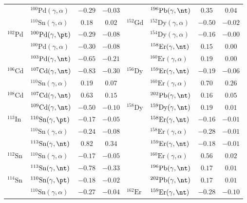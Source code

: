 {\begin{longtable}{llcc llcc}
$ $ & $^{100}\mathrm{Pd}(\gamma,\alpha)$ & $-0.29$ & $-0.03$ & $ $ & $^{196}\mathrm{Pb}(\gamma,\nt)$ & $0.35$ & $0.04$ \\ 
$ $ & $^{110}\mathrm{Sn}(\gamma,\alpha)$ & $0.18$ & $0.02$ & $^{152}\mathrm{Gd}$ & $^{152}\mathrm{Dy}(\gamma,\alpha)$ & $-0.50$ & $-0.02$ \\ 
$^{102}\mathrm{Pd}$ & $^{100}\mathrm{Pd}(\gamma,\pt)$ & $-0.29$ & $-0.08$ & $ $ & $^{154}\mathrm{Dy}(\gamma,\alpha)$ & $-0.16$ & $-0.00$ \\ 
$ $ & $^{100}\mathrm{Pd}(\gamma,\alpha)$ & $-0.30$ & $-0.08$ & $ $ & $^{158}\mathrm{Er}(\gamma,\nt)$ & $0.15$ & $0.00$ \\ 
$ $ & $^{103}\mathrm{Pd}(\gamma,\nt)$ & $-0.65$ & $-0.21$ & $ $ & $^{160}\mathrm{Er}(\gamma,\alpha)$ & $0.19$ & $0.00$ \\ 
$^{106}\mathrm{Cd}$ & $^{107}\mathrm{Cd}(\gamma,\nt)$ & $-0.83$ & $-0.30$ & $^{156}\mathrm{Dy}$ & $^{159}\mathrm{Er}(\gamma,\nt)$ & $-0.19$ & $-0.06$ \\ 
$ $ & $^{110}\mathrm{Sn}(\gamma,\alpha)$ & $0.19$ & $0.07$ & $ $ & $^{160}\mathrm{Er}(\gamma,\alpha)$ & $0.70$ & $0.26$ \\ 
$^{108}\mathrm{Cd}$ & $^{107}\mathrm{Cd}(\gamma,\nt)$ & $0.63$ & $0.15$ & $ $ & $^{202}\mathrm{Pb}(\gamma,\nt)$ & $0.16$ & $0.05$ \\ 
$ $ & $^{109}\mathrm{Cd}(\gamma,\nt)$ & $-0.50$ & $-0.10$ & $^{158}\mathrm{Dy}$ & $^{159}\mathrm{Dy}(\gamma,\nt)$ & $0.19$ & $0.01$ \\ 
$^{113}\mathrm{In}$ & $^{110}\mathrm{Sn}(\gamma,\pt)$ & $-0.17$ & $-0.05$ & $ $ & $^{158}\mathrm{Er}(\gamma,\nt)$ & $-0.16$ & $-0.01$ \\ 
$ $ & $^{110}\mathrm{Sn}(\gamma,\alpha)$ & $-0.24$ & $-0.08$ & $ $ & $^{158}\mathrm{Er}(\gamma,\alpha)$ & $-0.28$ & $-0.01$ \\ 
$ $ & $^{113}\mathrm{Sn}(\gamma,\nt)$ & $0.82$ & $0.34$ & $ $ & $^{159}\mathrm{Er}(\gamma,\nt)$ & $-0.18$ & $-0.01$ \\ 
$^{112}\mathrm{Sn}$ & $^{110}\mathrm{Sn}(\gamma,\alpha)$ & $-0.17$ & $-0.05$ & $ $ & $^{160}\mathrm{Er}(\gamma,\alpha)$ & $0.56$ & $0.02$ \\ 
$ $ & $^{113}\mathrm{Sn}(\gamma,\nt)$ & $-0.78$ & $-0.33$ & $ $ & $^{196}\mathrm{Pb}(\gamma,\nt)$ & $0.17$ & $0.01$ \\ 
$^{114}\mathrm{Sn}$ & $^{110}\mathrm{Sn}(\gamma,\pt)$ & $-0.18$ & $-0.02$ & $ $ & $^{202}\mathrm{Pb}(\gamma,\nt)$ & $0.17$ & $0.01$ \\ 
$ $ & $^{110}\mathrm{Sn}(\gamma,\alpha)$ & $-0.27$ & $-0.04$ & $^{162}\mathrm{Er}$ & $^{159}\mathrm{Er}(\gamma,\nt)$ & $-0.28$ & $-0.10$ \\ 

\end{longtable}}
